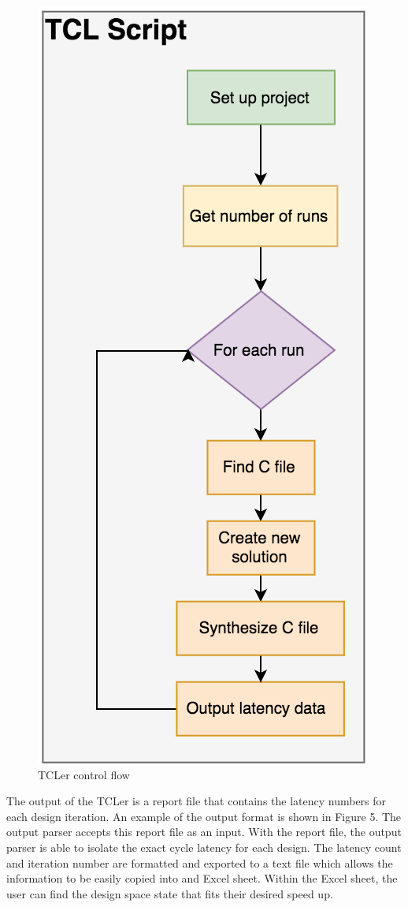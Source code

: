 \documentclass[letterpaper, 10 pt, conference]{IEEEconf}  %
\begin{document}
\begin{figure}[H]
\centering
\includegraphics[scale=.5]{tcler.png} 
\caption{TCLer control flow}
\end{figure}

The output of the TCLer is a report file that contains the latency numbers for each design iteration. An example of the output format is shown in Figure 5. The output parser accepts this report file as an input. With the report file, the output parser is able to isolate the exact cycle latency for each design. The latency count and iteration number are formatted and exported to a text file which allows the information to be easily copied into and Excel sheet. Within the Excel sheet, the user can find the design space state that fits their desired speed up.
\end{document}
